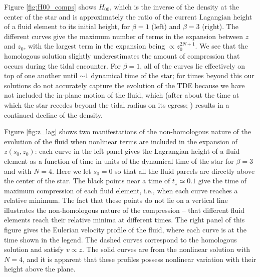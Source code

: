 \documentclass[twocolumn]{aastex62}
\begin{document}
Figure \ref{fig:H00_comps} shows $H_{00}$, which is the inverse of the density at the center of the star and is approximately the ratio of the current Lagangian height of a fluid element to its initial height, for $\beta = 1$ (left) and $\beta = 3$ (right). The different curves give the maximum number of terms in the expansion between $z$ and $z_0$, with the largest term in the expansion being $\propto z_0^{2N+1}$. We see that the homologous solution slightly underestimates the amount of compression that occurs during the tidal encounter. For $\beta = 1$, all of the curves lie effectively on top of one another until $\sim 1$ dynamical time of the star; for times beyond this our solutions do not accurately capture the evolution of the TDE because we have not included the in-plane motion of the fluid, which (after about the time at which the star recedes beyond the tidal radius on its egress; \citealt{coughlin20}) results in a continued decline of the density. 

Figure \ref{fig:z_lag} shows two manifestations of the non-homologous nature of the evolution of the fluid when nonlinear terms are included in the expansion of $z(s_0,z_0)$: each curve in the left panel gives the Lagrangian height of a fluid element as a function of time in units of the dynamical time of the star for $\beta = 3$ and with $N = 4$. Here we let $s_0 = 0$ so that all the fluid parcels are directly above the center of the star. The black points near a time of $t_{\star} \simeq 0.1$ give the time of maximum compression of each fluid element, i.e., when each curve reaches a relative minimum. The fact that these points do not lie on a vertical line illustrates the non-homologous nature of the compression -- that different fluid elements reach their relative minima at different times. The right panel of this figure gives the Eulerian velocity profile of the fluid, where each curve is at the time shown in the legend. The dashed curves correspond to the homologous solution and satisfy $v \propto z$. The solid curves are from the nonlinear solution with $N = 4$, and it is apparent that these profiles possess nonlinear variation with their height above the plane. 
\end{document}
